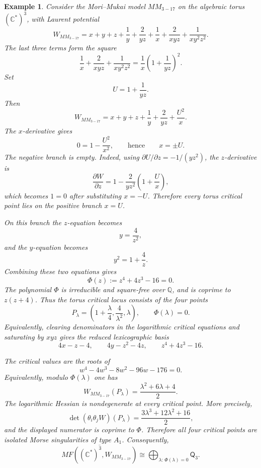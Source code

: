 \documentclass[11pt]{amsart}
\newtheorem{example}{Example}[section]
\newcommand{\MorseCat}[1]{\mathsf{Q}_{#1}}
\begin{document}
\begin{example}
Consider the Mori--Mukai model $MM_{3-17}$ on the algebraic torus
$(\mathbb{C}^*)^3$, with Laurent potential
\[
W_{MM_{3-17}}=x+y+z+\frac{1}{y}+\frac{2}{yz}
+\frac{1}{x}+\frac{2}{xyz}+\frac{1}{xy^2z^2}.
\]
The last three terms form the square
\[
\frac{1}{x}+\frac{2}{xyz}+\frac{1}{xy^2z^2}
=\frac{1}{x}\left(1+\frac{1}{yz}\right)^2.
\]
Set
\[
U=1+\frac{1}{yz}.
\]
Then
\[
W_{MM_{3-17}}=x+y+z+\frac{1}{y}+\frac{2}{yz}+\frac{U^2}{x}.
\]
The $x$-derivative gives
\[
0=1-\frac{U^2}{x^2},
\qquad\text{hence}\qquad
x=\pm U.
\]
The negative branch is empty. Indeed, using
$\partial U/\partial z=-1/(yz^2)$, the $z$-derivative is
\[
\frac{\partial W}{\partial z}
=1-\frac{2}{yz^2}\left(1+\frac{U}{x}\right),
\]
which becomes $1=0$ after substituting $x=-U$. Therefore every torus critical
point lies on the positive branch $x=U$.

On this branch the $z$-equation becomes
\[
y=\frac{4}{z^2},
\]
and the $y$-equation becomes
\[
y^2=1+\frac{4}{z}.
\]
Combining these two equations gives
\[
\Phi(z):=z^4+4z^3-16=0.
\]
The polynomial $\Phi$ is irreducible and square-free over $\mathbb{Q}$, and is
coprime to $z(z+4)$. Thus the torus critical locus consists of the four
points
\[
P_\lambda=\left(1+\frac{\lambda}{4},\frac{4}{\lambda^2},\lambda\right),
\qquad
\Phi(\lambda)=0.
\]
Equivalently, clearing denominators in the logarithmic critical equations and
saturating by $xyz$ gives the reduced lexicographic basis
\[
4x-z-4,
\qquad
4y-z^2-4z,
\qquad
z^4+4z^3-16.
\]

The critical values are the roots of
\[
w^4-4w^3-8w^2-96w-176=0.
\]
Equivalently, modulo $\Phi(\lambda)$ one has
\[
W_{MM_{3-17}}(P_\lambda)=\frac{\lambda^2+6\lambda+4}{2}.
\]
The logarithmic Hessian is nondegenerate at every critical point. More
precisely,
\[
\det(\theta_i\theta_jW)(P_\lambda)
=\frac{3\lambda^3+12\lambda^2+16}{2},
\]
and the displayed numerator is coprime to $\Phi$. Therefore all four critical
points are isolated Morse singularities of type $A_1$. Consequently,
\[
\overline{MF((\mathbb{C}^*)^3,W_{MM_{3-17}})}
\cong \bigoplus_{\lambda:\,\Phi(\lambda)=0}\MorseCat{3}.
\]
\end{example}
\end{document}
